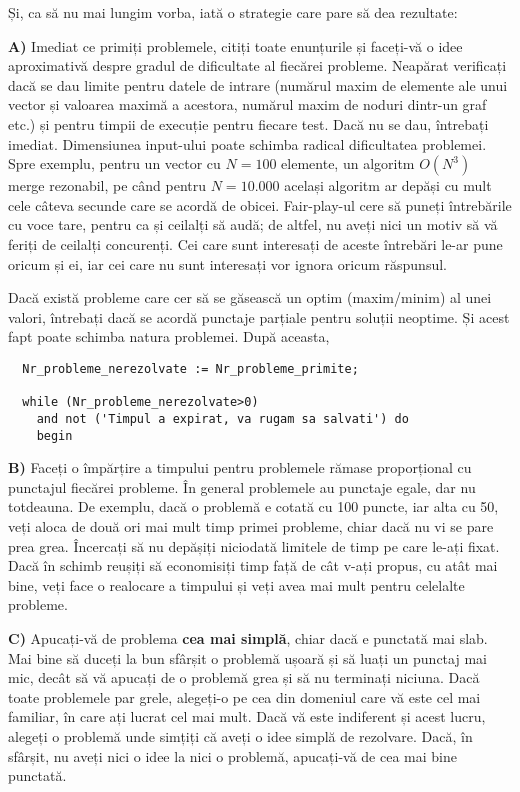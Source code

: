 Și, ca să nu mai lungim vorba, iată o strategie care pare să dea rezultate:

{\bf A)} Imediat ce primiți problemele, citiți toate enunțurile și faceți-vă o
idee aproximativă despre gradul de dificultate al fiecărei probleme. Neapărat
verificați dacă se dau limite pentru datele de intrare (numărul maxim de
elemente ale unui vector și valoarea maximă a acestora, numărul maxim de
noduri dintr-un graf etc.) și pentru timpii de execuție pentru fiecare
test. Dacă nu se dau, întrebați imediat. Dimensiunea input-ului poate schimba
radical dificultatea problemei. Spre exemplu, pentru un vector cu $N=100$
elemente, un algoritm $O(N^{3})$ merge rezonabil, pe când pentru $N=10.000$
același algoritm ar depăși cu mult cele câteva secunde care se acordă de
obicei. Fair-play-ul cere să puneți întrebările cu voce tare, pentru ca și
ceilalți să audă; de altfel, nu aveți nici un motiv să vă feriți de ceilalți
concurenți. Cei care sunt interesați de aceste întrebări le-ar pune oricum și
ei, iar cei care nu sunt interesați vor ignora oricum răspunsul.

Dacă există probleme care cer să se găsească un optim (maxim/minim) al unei
valori, întrebați dacă se acordă punctaje parțiale pentru soluții neoptime. Și
acest fapt poate schimba natura problemei. După aceasta,

\begin{verbatim}
  Nr_probleme_nerezolvate := Nr_probleme_primite;

  while (Nr_probleme_nerezolvate>0) 
    and not ('Timpul a expirat, va rugam sa salvati') do
    begin
\end{verbatim}

{\bf B)} Faceți o împărțire a timpului pentru problemele rămase proporțional
cu punctajul fiecărei probleme. În general problemele au punctaje egale, dar
nu totdeauna. De exemplu, dacă o problemă e cotată cu 100 puncte, iar alta cu
50, veți aloca de două ori mai mult timp primei probleme, chiar dacă nu vi se
pare prea grea. Încercați să nu depășiți niciodată limitele de timp pe care
le-ați fixat. Dacă în schimb reușiți să economisiți timp față de cât v-ați
propus, cu atât mai bine, veți face o realocare a timpului și veți avea mai
mult pentru celelalte probleme.

{\bf C)} Apucați-vă de problema {\bf cea mai simplă}, chiar dacă e punctată
mai slab. Mai bine să duceți la bun sfârșit o problemă ușoară și să luați un
punctaj mai mic, decât să vă apucați de o problemă grea și să nu terminați
niciuna. Dacă toate problemele par grele, alegeți-o pe cea din domeniul care
vă este cel mai familiar, în care ați lucrat cel mai mult. Dacă vă este
indiferent și acest lucru, alegeți o problemă unde simțiți că aveți o idee
simplă de rezolvare. Dacă, în sfârșit, nu aveți nici o idee la nici o
problemă, apucați-vă de cea mai bine punctată.

